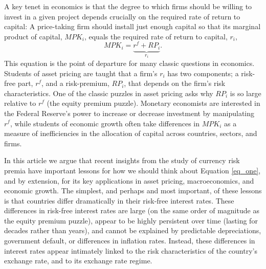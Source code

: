 \documentclass{ar-1col}
\begin{document}
A key tenet in economics is that the degree to which firms should be willing to invest in a given project depends crucially on the required rate of return to capital: A price-taking firm should install just enough capital so that its marginal product of capital, $MPK_i$, equals the required rate of return to capital, $r_i$,
\begin{equation}
  MPK_i=\underbrace{r^f+RP_i}_{r_i}.
  \label{eq_one}
\end{equation} 
This equation is the point of departure for many classic questions in economics. Students of asset pricing are taught that a firm's $r_i$ has two components; a risk-free part, $r^f$, and a risk-premium, $RP_i$, that depends on the firm's risk characteristics. One of the classic puzzles in asset pricing asks why $RP_i$ is so large relative to $r^f$ (the equity premium puzzle). Monetary economists are interested in the Federal Reserve's power to increase or decrease investment by manipulating $r^f$, while students of economic growth often take differences in $MPK_i$ as a measure of inefficiencies in the allocation of capital across countries, sectors, and firms.

In this article we argue that recent insights from the study of currency risk premia have important lessons for how we should think about Equation \eqref{eq_one}, and by extension, for its key applications in asset pricing, macroeconomics, and economic growth. The simplest, and perhaps and most important, of these lessons is that countries differ dramatically in their risk-free interest rates. These differences in risk-free interest rates are large (on the same order of magnitude as the equity premium puzzle), appear to be highly persistent over time (lasting for decades rather than years), and cannot be explained by predictable depreciations, government default, or differences in inflation rates. Instead, these differences in interest rates appear intimately linked to the risk characteristics of the country's exchange rate, and to its exchange rate regime.
\end{document}
